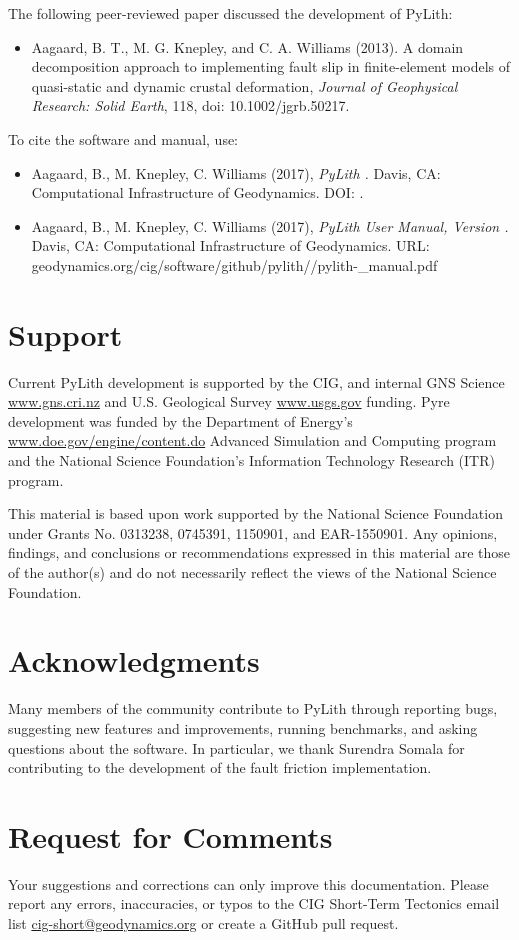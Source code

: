 The following peer-reviewed paper discussed the development of PyLith:
\begin{itemize}
\item Aagaard, B. T., M. G. Knepley, and C. A. Williams (2013). A
  domain decomposition approach to implementing fault slip in
  finite-element models of quasi-static and dynamic crustal
  deformation, \textit{Journal of Geophysical Research: Solid Earth},
  118, doi: 10.1002/jgrb.50217.
\end{itemize}
To cite the software and manual, use:
\begin{itemize}
\item Aagaard, B., M. Knepley, C. Williams (2017), \emph{PyLith
  \pylithVersion.} Davis, CA: Computational Infrastructure of
  Geodynamics. DOI: \pylithDOI.
\item Aagaard, B., M. Knepley, C. Williams (2017), \emph{PyLith User
  Manual, Version \pylithVersionNumber.} Davis, CA: Computational
  Infrastructure of Geodynamics. URL:
  geodynamics.org/cig/software/github/pylith/\pylithVersion/pylith-\pylithVersionNumber\_manual.pdf
\end{itemize}

\section{Support}

Current PyLith development is supported by the CIG, and internal GNS
Science \url{www.gns.cri.nz} and U.S. Geological Survey \url{www.usgs.gov}
funding. Pyre development was funded by the Department of Energy's
\url{www.doe.gov/engine/content.do} Advanced Simulation and Computing
program and the National Science Foundation's Information Technology
Research (ITR) program.

This material is based upon work supported by the National Science
Foundation under Grants No. 0313238, 0745391, 1150901, and
EAR-1550901. Any opinions, findings, and conclusions or
recommendations expressed in this material are those of the author(s)
and do not necessarily reflect the views of the National Science
Foundation.


\section{Acknowledgments}

Many members of the community contribute to PyLith through reporting
bugs, suggesting new features and improvements, running benchmarks,
and asking questions about the software. In particular, we thank Surendra
Somala for contributing to the development of the fault friction implementation.


\section{Request for Comments}

Your suggestions and corrections can only improve this documentation.
Please report any errors, inaccuracies, or typos to the CIG Short-Term
Tectonics email list \url{cig-short@geodynamics.org} or create a
GitHub pull request.
